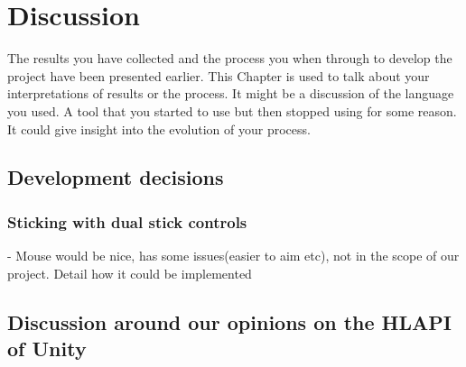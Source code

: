 \chapter{Discussion}
\label{chap:discussion}

The results you have collected and the process you when through to develop the project have been presented earlier.  This Chapter is used to talk about your interpretations of results or the process.  It might be a discussion of the language you used.  A tool that you started to use but then stopped using for some reason.  It could give insight into the evolution of your process.

\section{Development decisions}
\subsection{Sticking with dual stick controls}
    - Mouse would be nice, has some issues(easier to aim etc), not in the scope of our project. Detail how it could be implemented
\section{Discussion around our opinions on the HLAPI of Unity}
